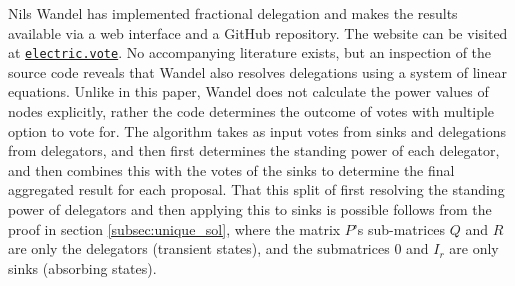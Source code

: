 Nils Wandel has implemented fractional delegation and makes the results available via a web interface and a GitHub repository. The website can be visited at \texttt{\url{electric.vote}}. No accompanying literature exists, but an inspection of the source code reveals that Wandel also resolves delegations using a system of linear equations. Unlike in this paper, Wandel does not calculate the power values of nodes explicitly, rather the code determines the outcome of votes with multiple option to vote for. The algorithm takes as input votes from sinks and delegations from delegators, and then first determines the standing power of each delegator, and then combines this with the votes of the sinks to determine the final aggregated result for each proposal. That this split of first resolving the standing power of delegators and then applying this to sinks is possible follows from the proof in section \cref{subsec:unique_sol}, where the matrix $P$'s sub-matrices $Q$ and $R$ are only the delegators (transient states), and the submatrices $0$ and $I_r$ are only sinks (absorbing states). \cite{nilsElectricvote2020}

